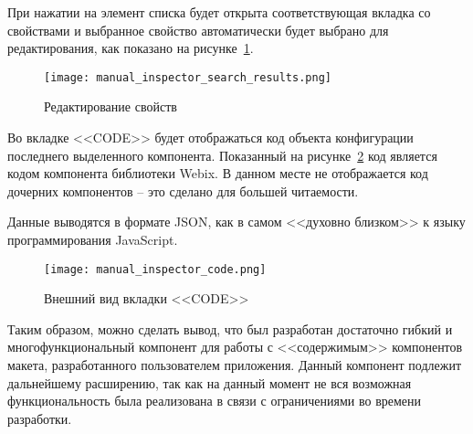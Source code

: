 При нажатии на элемент списка будет открыта соответствующая вкладка со свойствами и выбранное свойство автоматически будет выбрано для редактирования, как показано на рисунке~\ref{sec:manual:inspector_search_manual_results}.\pagebreak

\begin{figure}[ht]
  \centering
    \texttt{[image: manual\_inspector\_search\_results.png]}
    \caption{Редактирование свойств}
    \label{sec:manual:inspector_search_manual_results}
\end{figure}

Во вкладке <<CODE>> будет отображаться код объекта конфигурации последнего выделенного компонента. Показанный на рисунке~\ref{sec:manual:inspector_code} код является кодом компонента библиотеки Webix. В данном месте не отображается код дочерних компонентов -- это сделано для большей читаемости.

Данные выводятся в формате JSON, как в самом <<духовно близком>> к языку программирования JavaScript.

\begin{figure}[ht]
  \centering
    \texttt{[image: manual\_inspector\_code.png]}
    \caption{Внешний вид вкладки <<CODE>>}
    \label{sec:manual:inspector_code}
\end{figure}

Таким образом, можно сделать вывод, что был разработан достаточно гибкий и многофункциональный компонент для работы с <<содержимым>> компонентов макета, разработанного пользователем приложения. Данный компонент подлежит дальнейшему расширению, так как на данный момент не вся возможная функциональность была реализована в связи с ограничениями во времени разработки.

